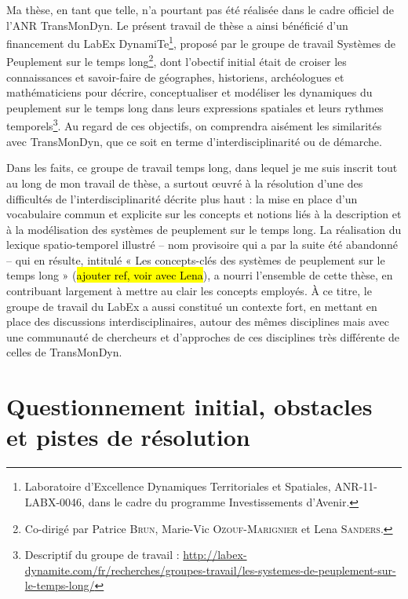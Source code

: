 Ma thèse, en tant que telle, n'a pourtant pas été réalisée dans le cadre officiel de l'ANR TransMonDyn.
Le présent travail de thèse a ainsi bénéficié d'un financement du LabEx DynamiTe\footnote{
Laboratoire d’Excellence \og Dynamiques Territoriales et Spatiales\fg{}, ANR-11-LABX-0046, dans le cadre du programme \og Investissements d’Avenir\fg{}.
}, proposé par le groupe de travail \og Systèmes de Peuplement sur le temps long\fg{}\footnote{
Co-dirigé par Patrice \textsc{Brun}, Marie-Vic \textsc{Ozouf-Marignier} et Lena \textsc{Sanders}.
}, dont l'obectif initial était de \og croiser les connaissances et savoir-faire de géographes, historiens, archéologues et mathématiciens pour décrire, conceptualiser et modéliser les dynamiques du peuplement sur le temps long dans leurs expressions spatiales et leurs rythmes temporels\fg{}\footnote{
Descriptif du groupe de travail : \href{http://labex-dynamite.com/fr/recherches/groupes-travail/les-systemes-de-peuplement-sur-le-temps-long/}{http://labex-dynamite.com/fr/recherches/groupes-travail/les-systemes-de-peuplement-sur-le-temps-long/}
}.
Au regard de ces objectifs, on comprendra aisément les similarités avec TransMonDyn, que ce soit en terme d'interdisciplinarité ou de démarche.

Dans les faits, ce groupe de travail \og temps long\fg{}, dans lequel je me suis inscrit tout au long de mon travail de thèse, a surtout œuvré à la résolution d'une des difficultés de l'interdisciplinarité décrite plus haut : la mise en place d'un vocabulaire commun et explicite sur les concepts et notions liés à la description et à la modélisation des systèmes de peuplement sur le temps long.
La réalisation du \og lexique spatio-temporel illustré\fg{} -- nom provisoire qui a par la suite été abandonné -- qui en résulte, intitulé \og « Les concepts-clés des systèmes de peuplement sur le temps long » (\hl{ajouter ref, voir avec Lena}), a nourri l'ensemble de cette thèse, en contribuant largement à mettre au clair les concepts employés.
À ce titre, le groupe de travail du LabEx a aussi constitué un contexte fort, en mettant en place des discussions interdisciplinaires, autour des mêmes disciplines mais avec une communauté de chercheurs et d'approches de ces disciplines très différente de celles de TransMonDyn.

\let\orisectionmark\sectionmark
\renewcommand\sectionmark[1]{}%
\section{Questionnement initial, obstacles et pistes de résolution \label{sec:evolution}}
\orisectionmark{Évolution du questionnement}
\let\sectionmark\orisectionmark

